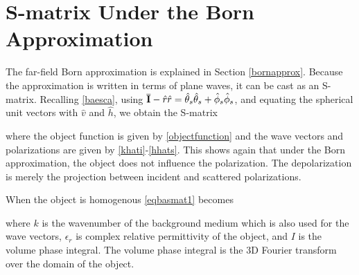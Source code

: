 {\footnotesize
{}
}


\section{S-matrix Under the Born Approximation}
\label{smatrixborn}

The far-field Born approximation is explained in Section \ref{bornapprox}. Because the approximation is written in terms of plane waves, it can be cast as an S-matrix.  Recalling \eqref{baesca}, using $\overline{\mathbf{I}}  - \hat{r}\hat{r} = \hat{\theta}_s\hat{\theta}_s + \hat{\phi}_s\hat{\phi}_s$, and equating the spherical unit vectors with $\hat{v}$ and $\hat{h}$, we obtain the S-matrix 


\noindent where the object function is given by \eqref{objectfunction} and the wave vectors and polarizations are given by \eqref{khati}-\eqref{hhats}. This shows again that under the Born approximation, the object does not influence the polarization. The depolarization is merely the projection between incident and scattered polarizations. 

When the object is homogenous \eqref{eqbasmat1} becomes 

\noindent where $k$ is the wavenumber of the background medium which is also used for the wave vectors, $\epsilon_r$ is complex relative permittivity of the object, and $I$ is the volume phase integral. The volume phase integral is the 3D Fourier transform over the domain of the object. 

\clearpage

